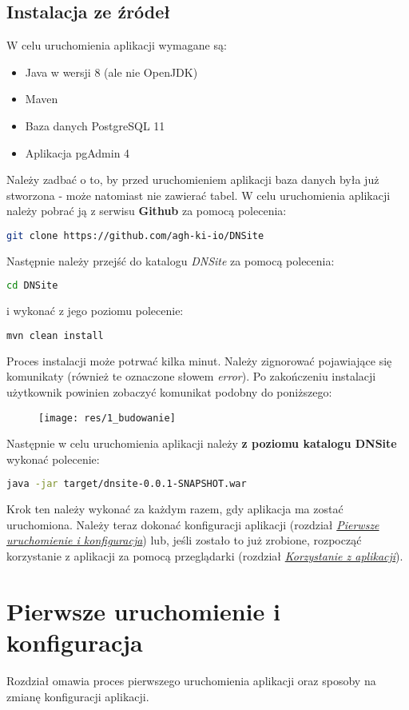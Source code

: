 \documentclass[12pt] {article}
\begin{document}
\subsection{Instalacja ze źródeł}
W celu uruchomienia aplikacji wymagane są:
\begin{itemize}
\item Java w wersji 8 (ale nie OpenJDK)
\item Maven
\item Baza danych PostgreSQL 11
\item Aplikacja pgAdmin 4
\end{itemize}
Należy zadbać o to, by przed uruchomieniem aplikacji baza danych była już stworzona - może natomiast nie zawierać tabel.
W celu uruchomienia aplikacji należy pobrać ją z serwisu \textbf{Github} za pomocą polecenia:
\begin{lstlisting}[language=bash]
git clone https://github.com/agh-ki-io/DNSite
\end{lstlisting}
Następnie należy przejść do katalogu \emph{DNSite} za pomocą polecenia:
\begin{lstlisting}[language=bash]
cd DNSite
\end{lstlisting}
i wykonać z jego poziomu polecenie:
\begin{lstlisting}[language=bash]
mvn clean install
\end{lstlisting}
Proces instalacji może potrwać kilka minut. Należy zignorować pojawiające się komunikaty (również te oznaczone słowem \emph{error}). Po zakończeniu instalacji użytkownik powinien zobaczyć komunikat podobny do poniższego:
\begin{figure}[H]
\centering
\texttt{[image: res/1\_budowanie]}
\end{figure}
Następnie w celu uruchomienia aplikacji należy \textbf{z poziomu katalogu DNSite} wykonać polecenie:
\begin{lstlisting}[language=bash]
java -jar target/dnsite-0.0.1-SNAPSHOT.war
\end{lstlisting}
Krok ten należy wykonać za każdym razem, gdy aplikacja ma zostać uruchomiona. Należy teraz dokonać konfiguracji aplikacji (rozdział \hyperref[first_run]{\emph{Pierwsze uruchomienie i konfiguracja}}) lub, jeśli zostało to już zrobione, rozpocząć korzystanie z aplikacji za pomocą przeglądarki (rozdział \hyperref[webapp]{\emph{Korzystanie z aplikacji}}).

\newpage
\section{Pierwsze uruchomienie i konfiguracja}
\label{first_run}
Rozdział omawia proces pierwszego uruchomienia aplikacji oraz sposoby na zmianę konfiguracji aplikacji.
\end{document}
